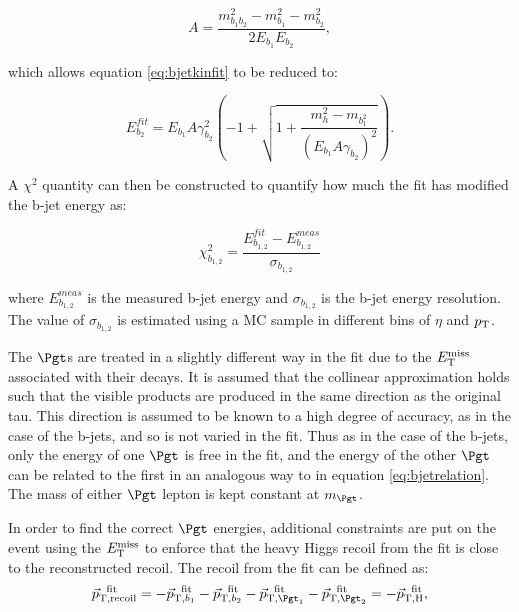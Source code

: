 \begin{equation}
A = \frac{m_{b_{1}b_{2}}^{2} - m_{b_{1}}^{2} - m_{b_{2}}^{2}}{2E_{b_{1}}E_{b_{2}}} , 
\end{equation}

which allows equation \ref{eq:bjetkinfit} to be reduced to:

\begin{equation}
E_{b_{2}}^{fit} = E_{b_{1}}A\gamma_{b_{2}}^{2}\left(-1 + \sqrt{1 +
\frac{m_{h}^{2} -
m_{b_{1}^{2}}}{\left(E_{b_{1}}A\gamma_{b_{2}}\right)^{2}}}\right) .
\label{eq:bjetrelation}
\end{equation}

A $\chi^{2}$ quantity can then be constructed to quantify how much the fit has
modified the b-jet energy as:

\begin{equation}
\chi_{b_{1,2}}^{2} = \frac{E_{b_{1,2}}^{fit} -
E_{b_{1,2}}^{meas}}{\sigma_{b_{1,2}}}
\end{equation}

where $E_{b_{1,2}}^{meas}$ is the measured b-jet energy and $\sigma_{b_{1,2}}$
is the b-jet energy resolution. The value of $\sigma_{b_{1,2}}$ is estimated
using a \ac{MC} sample in different bins of $\eta$ and $p_{\mathrm{T}}$. 

The $\Pgt$s are treated in a slightly different way in the fit due to the $E_{\mathrm{T}}^{\text{miss}}$
associated with their decays. It is assumed that the collinear approximation
holds such that the visible products are produced in the same direction as the
original tau. This direction is assumed to be known to a high degree of
accuracy, as in the case of the b-jets, and so is not varied in the fit. Thus as
in the case of the b-jets, only the energy of one $\Pgt$ is free in the fit, and
the energy of the other $\Pgt$ can be related to the first in an analogous way
to in equation \ref{eq:bjetrelation}. The mass of either $\Pgt$ lepton is kept
constant at $m_{\Pgt}$.  

In order to find the correct $\Pgt$ energies, additional constraints are put on
the event using the $E_{\mathrm{T}}^{\text{miss}}$ to enforce that the heavy Higgs recoil from the fit
is close to the reconstructed recoil. The recoil from the fit can be defined as:
\begin{equation}
\vec{p}_{\text{T},\text{recoil}}^{\text{~~fit}} = -
\vec{p}_{\text{T},b_{1}}^{\text{~~fit}} -
\vec{p}_{\text{T},b_{2}}^{\text{~~fit}} -
\vec{p}_{\text{T},\Pgt_{1}}^{\text{~~fit}} - \vec{p}_{\text{T},\Pgt_{2}}^{\text{~~fit}} = -
\vec{p}_{\text{T},\text{H}}^{\text{~~fit}} ,
\end{equation}

